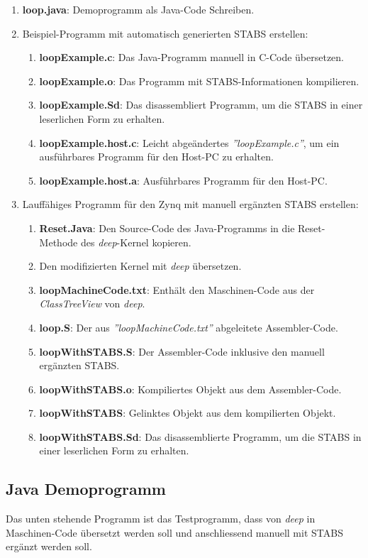 \begin{enumerate}
	\item \textbf{loop.java}: Demoprogramm als Java-Code Schreiben.
	\item Beispiel-Programm mit automatisch generierten STABS erstellen:
	\begin{enumerate}
		\item \textbf{loopExample.c}: Das Java-Programm manuell in C-Code übersetzen.
		\item \textbf{loopExample.o}: Das Programm mit STABS-Informationen kompilieren.
		\item \textbf{loopExample.Sd}: Das disassembliert Programm, um die STABS in einer leserlichen Form zu erhalten.
		\item \textbf{loopExample.host.c}: Leicht abgeändertes \textit{''loopExample.c''}, um ein ausführbares Programm für den Host-PC zu erhalten.
		\item \textbf{loopExample.host.a}: Ausführbares Programm für den Host-PC.
	\end{enumerate}
	\item Lauffähiges Programm für den Zynq mit manuell ergänzten STABS erstellen:
	\begin{enumerate}
		\item \textbf{Reset.Java}: Den Source-Code des Java-Programms in die Reset-Methode des \textit{deep}-Kernel kopieren.
		\item Den modifizierten Kernel mit \textit{deep} übersetzen.
		\item \textbf{loopMachineCode.txt}: Enthält den Maschinen-Code aus der \textit{ClassTreeView} von \textit{deep}.
		\item \textbf{loop.S}: Der aus \textit{''loopMachineCode.txt''} abgeleitete Assembler-Code.
		\item \textbf{loopWithSTABS.S}: Der Assembler-Code inklusive den manuell ergänzten STABS.
		\item \textbf{loopWithSTABS.o}: Kompiliertes Objekt aus dem Assembler-Code.
		\item \textbf{loopWithSTABS}: Gelinktes Objekt aus dem kompilierten Objekt.
		\item \textbf{loopWithSTABS.Sd}: Das disassemblierte Programm, um die STABS in einer leserlichen Form zu erhalten.
	\end{enumerate}
\end{enumerate}



\subsection{Java Demoprogramm}
Das unten stehende Programm ist das Testprogramm, dass von \textit{deep} in Maschinen-Code übersetzt werden soll und anschliessend manuell mit STABS ergänzt werden soll.

